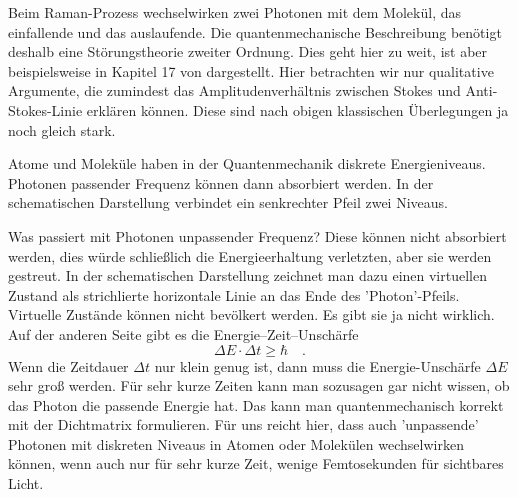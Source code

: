 Beim Raman-Prozess wechselwirken zwei Photonen mit dem Molekül, das einfallende und das auslaufende. Die quantenmechanische Beschreibung benötigt deshalb eine Störungstheorie zweiter Ordnung. Dies geht hier zu weit, ist aber beispielsweise in Kapitel 17 von \cite{Haken_wolf_II} dargestellt. Hier betrachten wir nur qualitative Argumente, die zumindest das Amplitudenverhältnis zwischen Stokes und Anti-Stokes-Linie erklären können. Diese sind nach obigen klassischen Überlegungen ja noch gleich stark.

Atome und Moleküle haben in der Quantenmechanik diskrete Energieniveaus. Photonen passender Frequenz können dann absorbiert werden. In der schematischen Darstellung verbindet ein senkrechter Pfeil zwei Niveaus.

\begin{marginfigure}
\end{marginfigure}
 

Was passiert mit Photonen unpassender Frequenz? Diese können nicht absorbiert werden, dies würde schließlich die Energieerhaltung verletzten, aber sie werden gestreut. In der schematischen Darstellung zeichnet man dazu einen virtuellen Zustand als strichlierte horizontale Linie an das Ende des 'Photon'-Pfeils. Virtuelle Zustände können nicht bevölkert werden. Es gibt sie ja nicht wirklich. Auf der anderen Seite gibt es die Energie--Zeit--Unschärfe
\begin{equation}
\Delta E \cdot \Delta t \ge \hbar \quad .
\end{equation}
Wenn die Zeitdauer $\Delta t $ nur klein genug ist, dann muss die Energie-Unschärfe $\Delta E $ sehr groß werden. Für sehr kurze Zeiten kann man sozusagen gar nicht wissen, ob das Photon die passende Energie hat. Das kann man quantenmechanisch korrekt mit der Dichtmatrix formulieren. Für uns reicht hier, dass auch 'unpassende' Photonen mit diskreten Niveaus in Atomen oder Molekülen wechselwirken können, wenn auch nur für sehr kurze Zeit, wenige Femtosekunden für sichtbares Licht.

